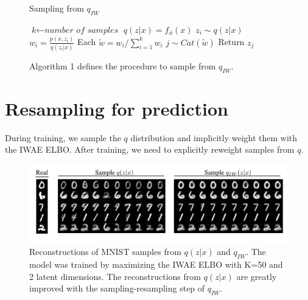 \documentclass{article} %
\begin{document}
\begin{figure}[t]
\centering
\begin{centering}
\begin{minipage}[t]{0.49\columnwidth}
\begin{algorithm}[H]
\caption{Sampling from $q_{IW}$}\label{algo1}
\begin{algorithmic}[1]
    \State $\textit{k} \gets \textit{number of samples}$
    \State $q(z|x) = f_\phi(x)$
        \State $z_i \sim q(z|x)$
        \State $w_i = \frac{p(x,z_i)}{q(z_i|x)}$
    \EndFor    
    \State Each $\tilde w = w_i/\sum_{i=1}^{k} w_i$
    \State $j \sim Cat(\tilde{w})$
    \State Return $z_j$
\end{algorithmic}
\end{algorithm}
\end{minipage}
\end{centering}

\hfill
\caption{Algorithm 1 defines the procedure to sample from $q_{IW}$.
}
\end{figure}





\section{Resampling for prediction}
During training, we sample the $q$ distribution and implicitly weight them with the IWAE ELBO. After training, we need to explicitly reweight samples from $q$.

\begin{figure}[H]
  \centering
      \includegraphics[width=1.\textwidth, clip, trim=0cm .5cm 0cm 0cm]{figs/samps.png}
  \caption{Reconstructions of MNIST samples from $q(z|x)$ and $q_{IW}$. The model was trained by maximizing the IWAE ELBO with K=50 and 2 latent dimensions. The reconstructions from $q(z|x)$ are greatly improved with the sampling-resampling step of $q_{IW}$.}
  \label{recon}
\end{figure}
\end{document}
